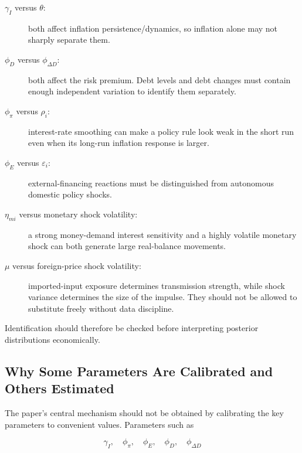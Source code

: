 \begin{description}
    \item[\(\gamma_I\) versus \(\theta\):]
    both affect inflation persistence/dynamics, so inflation alone may not
    sharply separate them.

    \item[\(\phi_D\) versus \(\phi_{\Delta D}\):]
    both affect the risk premium. Debt levels and debt changes must contain
    enough independent variation to identify them separately.

    \item[\(\phi_\pi\) versus \(\rho_i\):]
    interest-rate smoothing can make a policy rule look weak in the short run
    even when its long-run inflation response is larger.

    \item[\(\phi_E\) versus \(\varepsilon_i\):]
    external-financing reactions must be distinguished from autonomous
    domestic policy shocks.

    \item[\(\eta_{mi}\) versus monetary shock volatility:]
    a strong money-demand interest sensitivity and a highly volatile monetary
    shock can both generate large real-balance movements.

    \item[\(\mu\) versus foreign-price shock volatility:]
    imported-input exposure determines transmission strength, while shock
    variance determines the size of the impulse. They should not be allowed to
    substitute freely without data discipline.
\end{description}

Identification should therefore be checked before interpreting posterior
distributions economically.

\subsection{Why Some Parameters Are Calibrated and Others Estimated}
\label{app:calibration_estimation}

The paper's central mechanism should not be obtained by calibrating the key
parameters to convenient values. Parameters such as

\[
\gamma_I,\quad
\phi_\pi,\quad
\phi_E,\quad
\phi_D,\quad
\phi_{\Delta D}
\]

